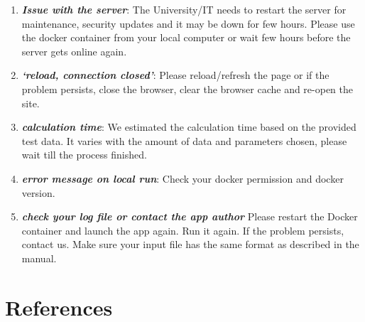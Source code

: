 \documentclass[
  a4paper,
  DIV=11,
  numbers=noendperiod,
  oneside,
  open=any]{scrreport}
\providecommand{\tightlist}{%
  \setlength{\itemsep}{0pt}\setlength{\parskip}{0pt}}\usepackage{longtable,booktabs,array}
\begin{document}
\begin{enumerate}
\def\labelenumi{\arabic{enumi}.}
\tightlist
\item
  \textbf{\emph{Issue with the server}}: The University/IT needs to
  restart the server for maintenance, security updates and it may be
  down for few hours. Please use the docker container from your local
  computer or wait few hours before the server gets online again.
\item
  \textbf{\emph{`reload, connection closed'}}: Please reload/refresh the
  page or if the problem persists, close the browser, clear the browser
  cache and re-open the site.
\item
  \textbf{\emph{calculation time}}: We estimated the calculation time
  based on the provided test data. It varies with the amount of data and
  parameters chosen, please wait till the process finished.
\item
  \textbf{\emph{error message on local run}}: Check your docker
  permission and docker version.
\item
  \textbf{\emph{check your log file or contact the app author}} Please
  restart the Docker container and launch the app again. Run it again.
  If the problem persists, contact us. Make sure your input file has the
  same format as described in the manual.
\end{enumerate}

\chapter*{References}\label{references}


\printbibliography[heading=none]
\end{document}
